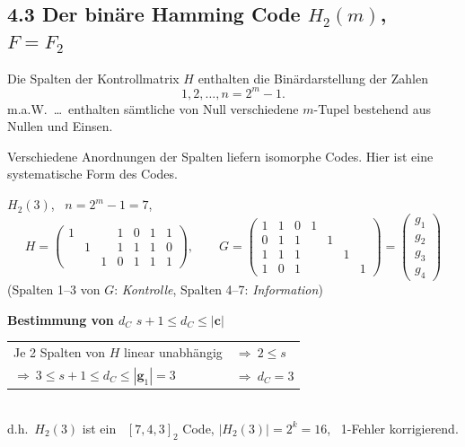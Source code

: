 \subsection{4.3 Der binäre Hamming Code $H_2(m)$, \ $F = F_2$}

\begin{definition}
Die Spalten der Kontrollmatrix $H$ enthalten die Binärdarstellung der Zahlen
\[ 1, 2, \dots, n = 2^m - 1. \]
m.a.W.\ \dots\ enthalten sämtliche von Null verschiedene $m$-Tupel bestehend aus Nullen und Einsen.
\end{definition}

Verschiedene Anordnungen der Spalten liefern isomorphe Codes. Hier ist eine systematische Form des Codes.

\begin{beispiel}
$H_2(3)$, \ $n = 2^m - 1 = 7$,
\[
H = \begin{pmatrix} 1 & & & 1 & 0 & 1 & 1 \\ & 1 & & 1 & 1 & 1 & 0 \\ & & 1 & 0 & 1 & 1 & 1 \end{pmatrix}, \qquad
G = \begin{pmatrix} 1 & 1 & 0 & 1 & & & \\ 0 & 1 & 1 & & 1 & & \\ 1 & 1 & 1 & & & 1 & \\ 1 & 0 & 1 & & & & 1 \end{pmatrix}
= \begin{pmatrix} g_1 \\ g_2 \\ g_3 \\ g_4 \end{pmatrix}
\]
(Spalten 1--3 von $G$: \textit{Kontrolle}, Spalten 4--7: \textit{Information})

\textbf{Bestimmung von $d_C$} \qquad $s + 1 \leq d_C \leq |\mathbf{c}|$\\
\begin{tabular}{ll}
Je 2 Spalten von $H$ linear unabhängig & $\Rightarrow \ 2 \leq s$ \\
$\Rightarrow \ 3 \leq s + 1 \leq d_C \leq |\mathbf{g}_1| = 3$ & $\Rightarrow \ d_C = 3$ \\
\end{tabular}\\
d.h.\ $H_2(3)$ ist ein \ $[7, 4, 3]_2$ Code, $|H_2(3)| = 2^k = 16$, \ 1-Fehler korrigierend.
\end{beispiel}

